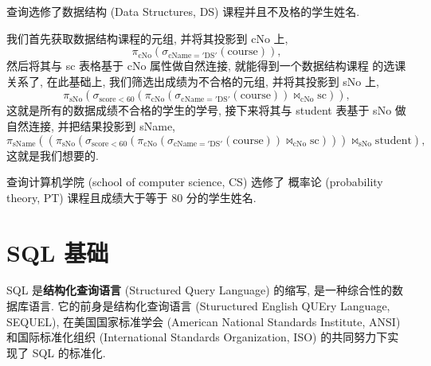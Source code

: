 \documentclass[10pt,UTF8]{book} %
\begin{document}
\begin{example}
    查询选修了数据结构 (Data Structures, DS) 课程并且不及格的学生姓名.
    \begin{sol}
        我们首先获取数据结构课程的元组, 并将其投影到 cNo 上,
        \[ \pi_\mathrm{cNo} \left(
            \sigma_\mathrm{cName = 'DS'}\left(
                \mathrm{course}
            \right)
        \right), \]
        然后将其与 sc 表格基于 cNo 属性做自然连接, 就能得到一个数据结构课程
        的选课关系了, 在此基础上, 我们筛选出成绩为不合格的元组,
        并将其投影到 sNo 上,
        \[ \pi_\mathrm{sNo}\left(\sigma_{\mathrm{score < 60}} \left(
            \pi_\mathrm{cNo} \left(
            \sigma_\mathrm{cName = 'DS'}\left(
                \mathrm{course}
            \right)
        \right)
        \Join_\mathrm{cNo} \mathrm{sc}
        \right)\right), \]
        这就是所有的数据成绩不合格的学生的学号,
        接下来将其与 student 表基于 sNo 做自然连接, 并把结果投影到 sName,
        \[ \pi_\mathrm{sName} \left(
            \left(\pi_\mathrm{sNo}\left(\sigma_{\mathrm{score < 60}} \left(
            \pi_\mathrm{cNo} \left(
            \sigma_\mathrm{cName = 'DS'}\left(
                \mathrm{course}
            \right)
        \right)
        \Join_\mathrm{cNo} \mathrm{sc}
        \right)\right)\right) \Join_\mathrm{sNo} \mathrm{student}
        \right), \]
        这就是我们想要的.
    \end{sol}
\end{example}

\begin{example}
    查询计算机学院 (school of computer science, CS) 选修了
    概率论 (probability theory, PT) 课程且成绩大于等于 80 分的学生姓名.
    \begin{sol}
        
    \end{sol}
\end{example}

\newpage
\thispagestyle{empty}

\chapter{SQL 基础}

SQL 是\textbf{结构化查询语言} (Structured Query Language) 的缩写,
是一种综合性的数据库语言.
它的前身是结构化查询语言 (Stuructured English QUEry Language, SEQUEL),
在美国国家标准学会 (American National Standards Institute, ANSI) 和国际标准化组织
(International Standards Organization, ISO) 的共同努力下实现了 SQL 的标准化.
\end{document}

